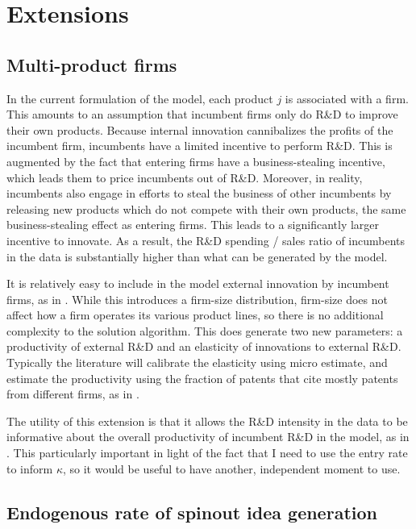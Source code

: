 \documentclass[12pt,english]{article}
\theoremstyle{remark}
\begin{document}
\section{Extensions}\label{extensions}

\subsection{Multi-product firms}

In the current formulation of the model, each product $j$ is associated with a firm. This amounts to an assumption that incumbent firms only do R\&D to improve their own products. Because internal innovation cannibalizes the profits of the incumbent firm, incumbents have a limited incentive to perform R\&D. This is augmented by the fact that entering firms have a business-stealing incentive, which leads them to price incumbents out of R\&D. Moreover, in reality, incumbents also engage in efforts to steal the business of other incumbents by releasing new products which do not compete with their own products, the same business-stealing effect as entering firms. This leads to a significantly larger incentive to innovate. As a result, the R\&D spending / sales ratio of incumbents in the data is substantially higher than what can be generated by the model.

It is relatively easy to include in the model external innovation by incumbent firms, as in \cite{klette_innovating_2004}. While this introduces a firm-size distribution, firm-size does not affect how a firm operates its various product lines, so there is no additional complexity to the solution algorithm. This does generate two new parameters: a productivity of external R\&D and an elasticity of innovations to external R\&D. Typically the literature will calibrate the elasticity using micro estimate, and estimate the productivity using the fraction of patents that cite mostly patents from different firms, as in \cite{akcigit_growth_2018}.

The utility of this extension is that it allows the R\&D intensity in the data to be informative about the overall productivity of incumbent R\&D in the model, as in \cite{akcigit_growth_2018}. This particularly important in light of the fact that I need to use the entry rate to inform $\kappa$, so it would be useful to have another, independent moment to use.  

\subsection{Endogenous rate of spinout idea generation}
\end{document}
